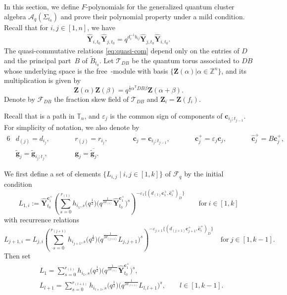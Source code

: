  In this section, we define $F$-polynomials for the generalized quantum cluster algebra $\mathcal{A}_q(\Sigma_{t_0})$ and prove their polynomial property under a mild condition.
Recall that for $i,j\in[1,n]$, we have
\begin{align}\label{eq:quasi-com}
\mathbf{\hat{Y}}_{i,t_{0}}\mathbf{\hat{Y}}_{j,t_{0}}=q^{d_{i}^{-1}b_{ij}}\mathbf{\hat{Y}}_{j,t_{0}}\mathbf{\hat{Y}}_{i,t_{0}}.
\end{align}
The quasi-commutative relations \eqref{eq:quasi-com} depend only on the entries of $D$ and the principal part~$B$ of $\tilde{B}_{t_0}$.
Let $\mathcal{T}_{DB}$ be the quantum torus associated to $DB$ whose underlying space is the free~-module with basis $\{\mathbf{Z}(\alpha)| \alpha\in\mathbb{Z}^{n}\}$, and its multiplication is given by
\[\mathbf{Z}(\alpha)\mathbf{Z}(\beta)=q^{\frac{1}{2}\alpha^{\mathsf T}DB\beta}\mathbf{Z}(\alpha+\beta).\]
Denote by $\mathcal{F}_{DB}$ the fraction skew field of $\mathcal{T}_{DB}$ and $\mathbf{Z}_{i}=\mathbf{Z}(f_{i})$.

Recall that  is a path in $\mathbb{T}_n$, and $\varepsilon_{j}$ is the common sign of components of $\mathbf{c}_{i_j;t_{j-1}}$. For simplicity of notation, we also denote by
\begin{alignat*}{6}
& d_{(j)}=d_{i_j},\qquad&&
r_{(j)}=r_{i_j},  \qquad &&  \mathbf{c}_{j}=\mathbf{c}_{i_j;t_{j-1}},\qquad&&    \mathbf{c}_{j}^+=\varepsilon_{j}\mathbf{c}_{j}, \qquad&&   \mathbf{\hat{c}}_{j}^+=B\mathbf{c}_{j}^+,& \\
& \mathbf{\tilde{g}}_{j}=\mathbf{\tilde{g}}_{i_j;t_j}, \qquad&&   \mathbf{g}_{j}=\overline{\mathbf{\tilde{g}}_{j}}.&&&&&&&
\end{alignat*}

We first define a set of elements $\{ L_{i,j}\mid i,j\in [1,k]\}$ of $\mathcal{F}_q$ by the initial condition
\[L_{1,i}:=\mathbf{\hat{Y}}_{t_{0}}^{\mathbf{c}_{i}^{+}}\left(\sum\limits^{r_{(1)}}_{s=0}h_{i_{1},s}
\bigl(q^{\frac{1}{2}}\bigr)\bigl(q^{\frac{1}{2d_{(1)}}}\mathbf{\hat{Y}}_{t_0}^{\mathbf{c}_{1}^{+}}\bigr)^{s}\right)^{-\varepsilon_{1}\{(d_{(1)}\mathbf{c}_{1}^{+},\mathbf{\hat{c}}_{i}^{+})_{D}\}} \qquad \text{for}\  i\in [1,k]
\]
with recurrence relations
\[
 L_{j+1,i}=L_{j,i}\left(\sum\limits^{r_{(j+1)}}_{s=0}h_{i_{j+1},s}\bigl(q^{\frac{1}{2}}\bigr)
 \bigl(q^{\frac{1}{2d_{(j+1)}}}L_{j,j+1}\bigr)^{s} \right)^{-\varepsilon_{j+1}\{(d_{(j+1)}\mathbf{c}_{j+1}^{+},\mathbf{\hat{c}}_{i}^{+})_{D}\}} \quad \text{for}\  j \in [1,k-1].
\]
Then set
\begin{align*}
 &L_1=\sum\limits^{r_{(1)}}_{s=0}h_{i_{1},s}\bigl(q^{\frac{1}{2}}\bigr)\bigl(q^{\frac{1}{2d_{(1)}}}\mathbf{\hat{Y}}_{t_{0}}^{\mathbf{c}_{1}^{+}}\bigr)^{s},\\
 &L_{l+1}=\sum\limits_{s=0}^{r_{(l+1)}}h_{i_{l+1},s}\bigl(q^{\frac{1}{2}}\bigr)\bigl(q^{\frac{1}{2d_{(l+1)}}}L_{l,l+1}\bigr)^{s},\qquad l\in[1,k-1].
 \end{align*}


